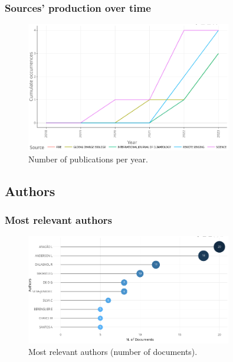 \documentclass[aspectratio=169]{beamer}
\begin{document}
\begin{frame}
  \frametitle{Sources' production over time}
  \begin{figure}
    \centering
    \includegraphics[width=0.8\textwidth]
    {img/sources_production_over_time.png}
    \caption{Number of publications per year.}
    \label{fig:production_over_time}
  \end{figure}
\end{frame}



\subsection{Authors}

\begin{frame}
  \frametitle{Most relevant authors}
  \begin{figure}
    \centering
    \includegraphics[width=0.8\textwidth]
    {img/most_relevant_authors.png}
    \caption{Most relevant authors (number of documents).}
    \label{fig:most_relevant_authors}
  \end{figure}
\end{frame}
\end{document}
